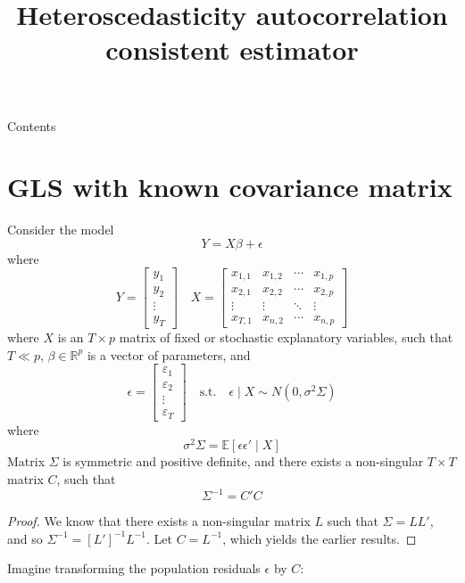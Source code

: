 \documentclass[10pt,handout,english]{beamer}
\title[]{Heteroscedasticity autocorrelation consistent estimator}
\date[27/10/2020]
\newcommand{\E}{\mathbb{E}}
\newcommand{\R}{\mathbb{R}}
\begin{document}
\begin{frame}
\titlepage
\end{frame}


\begin{frame}{Contents}
\tableofcontents
\end{frame}


\section{GLS with known covariance matrix}
\begin{frame}[allowframebreaks]
Consider the model
\begin{equation}\label{eq: regression}
Y=X\beta+\epsilon
\end{equation}
where
\[
Y=
\begin{bmatrix}
y_1\\
y_2\\
\vdots\\
y_T
\end{bmatrix}
\quad
X=
\begin{bmatrix}
x_{1,1}&x_{1,2}&\cdots&x_{1,p}\\
x_{2,1}&x_{2,2}&\cdots&x_{2,p}\\
\vdots&\vdots&\ddots&\vdots\\
x_{T,1}&x_{n,2}&\cdots&x_{n,p}
\end{bmatrix}
\]
where $X$ is an $T\times p$ matrix of fixed or stochastic explanatory variables, such that $T\ll p$, $\beta\in\R^p$ is a vector of parameters, and
\begin{equation}\label{eq: covariance matrix}
\epsilon=
\begin{bmatrix}
\varepsilon_1\\
\varepsilon_2\\
\vdots\\
\varepsilon_T
\end{bmatrix}
\quad
\text{s.t.}
\quad
\epsilon\mid X\sim N(0,\sigma^2\Sigma)
\end{equation}
where 
\[
\sigma^2\Sigma=\E\left[\epsilon\epsilon'\mid X\right]
\]
Matrix $\Sigma$ is symmetric and positive definite, and there exists a non-singular $T\times T$ matrix $C$, such that
\[
\Sigma^{-1}=C'C
\]
\begin{proof}
We know that there exists a non-singular matrix $L$ such that $\Sigma=LL'$, and so $\Sigma^{-1}=[L']^{-1}L^{-1}$. Let $C=L^{-1}$, which yields the earlier results.
\end{proof}
Imagine transforming the population residuals $\epsilon$ by $C$:

\end{frame}
\end{document}
